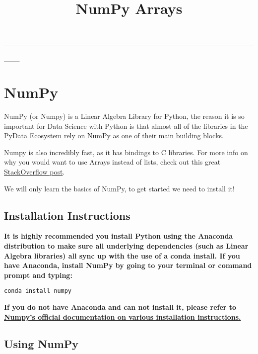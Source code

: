 \documentclass[11pt]{article}
\title{NumPy Arrays}
\begin{document}
    
    
    \maketitle
    
    

    
    \begin{center}\rule{0.5\linewidth}{\linethickness}\end{center}

 \_\_\_

    \section{NumPy}\label{numpy}

NumPy (or Numpy) is a Linear Algebra Library for Python, the reason it
is so important for Data Science with Python is that almost all of the
libraries in the PyData Ecosystem rely on NumPy as one of their main
building blocks.

Numpy is also incredibly fast, as it has bindings to C libraries. For
more info on why you would want to use Arrays instead of lists, check
out this great
\href{http://stackoverflow.com/questions/993984/why-numpy-instead-of-python-lists}{StackOverflow
post}.

We will only learn the basics of NumPy, to get started we need to
install it!

    \subsection{Installation Instructions}\label{installation-instructions}

\textbf{It is highly recommended you install Python using the Anaconda
distribution to make sure all underlying dependencies (such as Linear
Algebra libraries) all sync up with the use of a conda install. If you
have Anaconda, install NumPy by going to your terminal or command prompt
and typing:}

\begin{verbatim}
conda install numpy
\end{verbatim}

\textbf{If you do not have Anaconda and can not install it, please refer
to
\href{http://docs.scipy.org/doc/numpy-1.10.1/user/install.html}{Numpy's
official documentation on various installation instructions.}}

    \subsection{Using NumPy}\label{using-numpy}
\end{document}
